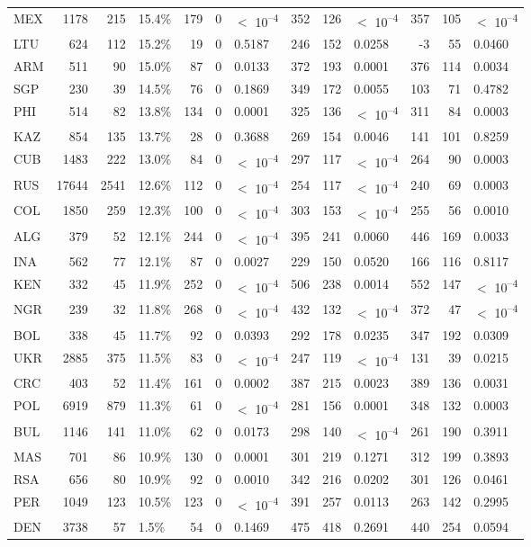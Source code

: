 \begin{tabular}[t]{lrrlrrlrrlrrl}
MEX & 1178 & 215 & 15.4\% & 179 & 0 & $<$ 10\textsuperscript{--4} & 352 & 126 & $<$ 10\textsuperscript{--4} & 357 & 105 & $<$ 10\textsuperscript{--4}\\
LTU & 624 & 112 & 15.2\% & 19 & 0 & 0.5187 & 246 & 152 & 0.0258 & -3 & 55 & 0.0460\\
ARM & 511 & 90 & 15.0\% & 87 & 0 & 0.0133 & 372 & 193 & 0.0001 & 376 & 114 & 0.0034\\
SGP & 230 & 39 & 14.5\% & 76 & 0 & 0.1869 & 349 & 172 & 0.0055 & 103 & 71 & 0.4782\\
PHI & 514 & 82 & 13.8\% & 134 & 0 & 0.0001 & 325 & 136 & $<$ 10\textsuperscript{--4} & 311 & 84 & 0.0003\\
KAZ & 854 & 135 & 13.7\% & 28 & 0 & 0.3688 & 269 & 154 & 0.0046 & 141 & 101 & 0.8259\\
CUB & 1483 & 222 & 13.0\% & 84 & 0 & $<$ 10\textsuperscript{--4} & 297 & 117 & $<$ 10\textsuperscript{--4} & 264 & 90 & 0.0003\\
RUS & 17644 & 2541 & 12.6\% & 112 & 0 & $<$ 10\textsuperscript{--4} & 254 & 117 & $<$ 10\textsuperscript{--4} & 240 & 69 & 0.0003\\
COL & 1850 & 259 & 12.3\% & 100 & 0 & $<$ 10\textsuperscript{--4} & 303 & 153 & $<$ 10\textsuperscript{--4} & 255 & 56 & 0.0010\\
ALG & 379 & 52 & 12.1\% & 244 & 0 & $<$ 10\textsuperscript{--4} & 395 & 241 & 0.0060 & 446 & 169 & 0.0033\\
INA & 562 & 77 & 12.1\% & 87 & 0 & 0.0027 & 229 & 150 & 0.0520 & 166 & 116 & 0.8117\\
KEN & 332 & 45 & 11.9\% & 252 & 0 & $<$ 10\textsuperscript{--4} & 506 & 238 & 0.0014 & 552 & 147 & $<$ 10\textsuperscript{--4}\\
NGR & 239 & 32 & 11.8\% & 268 & 0 & $<$ 10\textsuperscript{--4} & 432 & 132 & $<$ 10\textsuperscript{--4} & 372 & 47 & $<$ 10\textsuperscript{--4}\\
BOL & 338 & 45 & 11.7\% & 92 & 0 & 0.0393 & 292 & 178 & 0.0235 & 347 & 192 & 0.0309\\
UKR & 2885 & 375 & 11.5\% & 83 & 0 & $<$ 10\textsuperscript{--4} & 247 & 119 & $<$ 10\textsuperscript{--4} & 131 & 39 & 0.0215\\
CRC & 403 & 52 & 11.4\% & 161 & 0 & 0.0002 & 387 & 215 & 0.0023 & 389 & 136 & 0.0031\\
POL & 6919 & 879 & 11.3\% & 61 & 0 & $<$ 10\textsuperscript{--4} & 281 & 156 & 0.0001 & 348 & 132 & 0.0003\\
BUL & 1146 & 141 & 11.0\% & 62 & 0 & 0.0173 & 298 & 140 & $<$ 10\textsuperscript{--4} & 261 & 190 & 0.3911\\
MAS & 701 & 86 & 10.9\% & 130 & 0 & 0.0001 & 301 & 219 & 0.1271 & 312 & 199 & 0.3893\\
RSA & 656 & 80 & 10.9\% & 92 & 0 & 0.0010 & 342 & 216 & 0.0202 & 301 & 126 & 0.0461\\
PER & 1049 & 123 & 10.5\% & 123 & 0 & $<$ 10\textsuperscript{--4} & 391 & 257 & 0.0113 & 263 & 142 & 0.2995\\
DEN & 3738 & 57 & 1.5\% & 54 & 0 & 0.1469 & 475 & 418 & 0.2691 & 440 & 254 & 0.0594\\
\bottomrule
\end{tabular}
